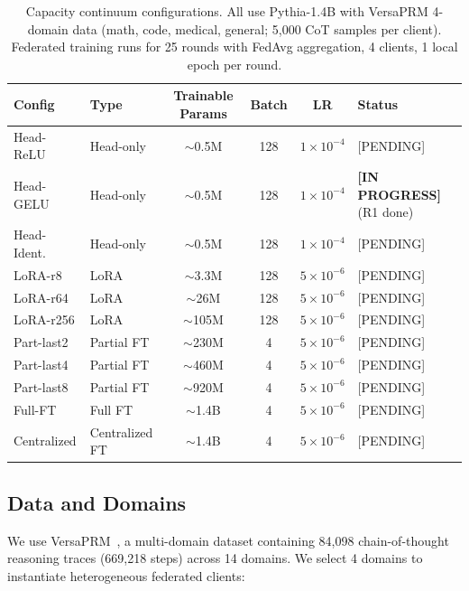 \documentclass{article}
\begin{document}
\begin{table}[h]
\centering
\caption{Capacity continuum configurations. All use Pythia-1.4B with VersaPRM 4-domain data (math, code, medical, general; 5,000 CoT samples per client). Federated training runs for 25 rounds with FedAvg aggregation, 4 clients, 1 local epoch per round.}
\label{tab:configs}
\small
\begin{tabular}{@{}llcccl@{}}
\toprule
\textbf{Config} & \textbf{Type} & \textbf{Trainable Params} & \textbf{Batch} & \textbf{LR} & \textbf{Status} \\
\midrule
Head-ReLU    & Head-only       & $\sim$0.5M  & 128 & $1\times10^{-4}$ & [PENDING] \\
Head-GELU    & Head-only       & $\sim$0.5M  & 128 & $1\times10^{-4}$ & \textbf{[IN PROGRESS]} (R1 done) \\
Head-Ident.  & Head-only       & $\sim$0.5M  & 128 & $1\times10^{-4}$ & [PENDING] \\
LoRA-r8      & LoRA            & $\sim$3.3M  & 128 & $5\times10^{-6}$ & [PENDING] \\
LoRA-r64     & LoRA            & $\sim$26M   & 128 & $5\times10^{-6}$ & [PENDING] \\
LoRA-r256    & LoRA            & $\sim$105M  & 128 & $5\times10^{-6}$ & [PENDING] \\
Part-last2   & Partial FT      & $\sim$230M  & 4   & $5\times10^{-6}$ & [PENDING] \\
Part-last4   & Partial FT      & $\sim$460M  & 4   & $5\times10^{-6}$ & [PENDING] \\
Part-last8   & Partial FT      & $\sim$920M  & 4   & $5\times10^{-6}$ & [PENDING] \\
Full-FT      & Full FT         & $\sim$1.4B  & 4   & $5\times10^{-6}$ & [PENDING] \\
Centralized  & Centralized FT  & $\sim$1.4B  & 4   & $5\times10^{-6}$ & [PENDING] \\
\bottomrule
\end{tabular}
\end{table}

\subsection{Data and Domains}

We use VersaPRM~\cite{versaprm2025}, a multi-domain dataset containing 84,098 chain-of-thought reasoning traces (669,218 steps) across 14 domains.
We select 4 domains to instantiate heterogeneous federated clients:
\end{document}

